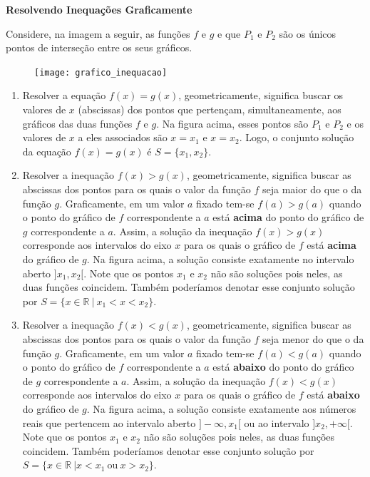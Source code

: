 \begin{observation}{}
\textbf{Resolvendo Inequações Graficamente}

Considere, na imagem a seguir, as funções $f$ e $g$ e que $P_1$ e $P_2$ são os únicos pontos de interseção entre os seus gráficos.

\begin{figure}[H]
\centering
\noindent\texttt{[image: grafico\_inequacao]}
\end{figure}


\begin{enumerate}
\item{}
	Resolver a equação $f(x) = g(x)$, geometricamente, significa buscar os valores de $x$ (abscissas) dos pontos que pertençam, simultaneamente, aos gráficos das duas funções $f$ e $g$. Na figura acima, esses pontos são $P_1$ e $P_2$ e os valores de $x$ a eles associados são $x = x_1$ e $x = x_2$. Logo, o conjunto solução da equação $f(x) = g(x)$ é $S =\{x_1, x_2\}$.

\item{}	
Resolver a inequação $f(x) > g(x)$, geometricamente, significa buscar as abscissas dos pontos para os quais o valor da função $f$ seja  maior do que o da função $g$. Graficamente, em um valor $a$ fixado tem-se $f(a)>g(a)$ quando o ponto do gráfico de $f$ correspondente a $a$ está \textbf{acima} do ponto do gráfico de $g$ correspondente a $a$. Assim, a solução da inequação $f(x)>g(x)$ corresponde aos intervalos do eixo $x$ para os quais o gráfico de $f$ está \textbf{acima} do gráfico de $g$. Na figura acima, a solução consiste exatamente no intervalo aberto $]x_1, x_2[$. Note que os pontos $x_1$ e $x_2$ não são soluções pois neles, as duas funções coincidem. Também poderíamos denotar esse conjunto solução por $S = \{x \in \mathbb{R}\ | \ x_1 < x < x_2\}$.

\item{}
Resolver a inequação $f(x) < g(x)$, geometricamente, significa buscar as abscissas dos pontos para os quais o valor da função $f$ seja menor do que o da função $g$. Graficamente, em um valor $a$ fixado tem-se $f(a)<g(a)$ quando o ponto do gráfico de $f$ correspondente a $a$ está \textbf{abaixo} do ponto do gráfico de $g$ correspondente a $a$. Assim, a solução da inequação $f(x)<g(x)$ corresponde aos intervalos do eixo $x$ para os quais o gráfico de $f$ está \textbf{abaixo} do gráfico de $g$. Na figura acima, a solução consiste exatamente aos números reais que pertencem ao intervalo aberto $]-\infty, x_1[$ ou ao intervalo $]x_2, +\infty[$. Note que os pontos $x_1$ e $x_2$ não são soluções pois neles, as duas funções coincidem. Também poderíamos denotar esse conjunto solução por $S = \{x \in \mathbb{R}\ | x < x_1 \ \mbox{ou} \ x > x_2\}$.


\end{enumerate}
\end{observation}

